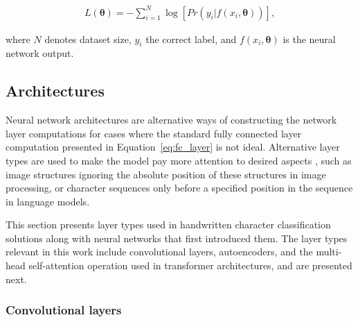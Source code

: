\documentclass{article}
\begin{document}
\begin{align}
    L(\mathbf{\theta})=-\sum_{i=1}^{N}\log[Pr(y_i|f(x_i,\mathbf{\theta}))],
\end{align}

where $N$ denotes dataset size, $y_i$ the correct label, and $f(x_i, \mathbf{\theta})$ is the neural network output.


\subsection{Architectures}

Neural network architectures are alternative ways of constructing the 
network layer computations for cases where the standard 
fully connected layer computation presented in Equation~\ref{eq:fc_layer}
is not ideal. Alternative layer types are used to make the model pay more attention to desired 
aspects \cite{alexnet}, such as image structures ignoring the absolute position of these structures in image processing, or 
character sequences only before a specified position in the sequence in language models.

This section presents layer types used in handwritten character classification 
solutions along with neural networks that first introduced them.
The layer types relevant in this work include convolutional layers, autoencoders, and the multi-head self-attention operation used in transformer 
architectures, and are presented next.

\subsubsection{Convolutional layers}
\end{document}
